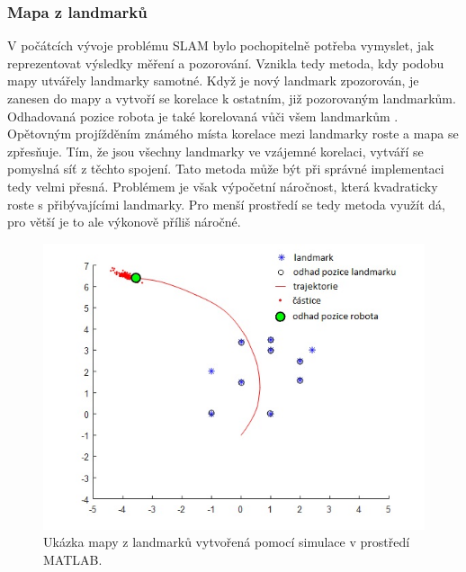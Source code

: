 \documentclass[12pt]{report}
\begin{document}
\subsubsection{Mapa z landmarků}
V počátcích vývoje problému SLAM bylo pochopitelně potřeba vymyslet, jak reprezentovat výsledky měření a pozorování. Vznikla tedy metoda, kdy podobu mapy utvářely landmarky samotné. Když je nový landmark zpozorován, je zanesen do mapy a vytvoří se korelace k ostatním, již pozorovaným landmarkům. Odhadovaná pozice robota je také korelovaná vůči všem landmarkům \cite{Durrant-Whyte2006}. \\
\indent Opětovným projížděním známého místa korelace mezi landmarky roste a mapa se zpřesňuje. Tím, že jsou všechny landmarky ve vzájemné korelaci, vytváří se pomyslná síť z těchto spojení. Tato metoda může být při správné implementaci tedy velmi přesná. Problémem je však výpočetní náročnost, která kvadraticky roste s přibývajícími landmarky. Pro menší prostředí se tedy metoda využít dá, pro větší je to ale výkonově příliš náročné.

\begin{figure}[!ht]
	\begin{center}
		\includegraphics[width=0.7\columnwidth]{imgs/landmark_map.jpg}
	\end{center}
	\caption{Ukázka mapy z landmarků vytvořená pomocí simulace v prostředí MATLAB.}
	\label{fig:landmark_map}
\end{figure}
\newpage
\end{document}
